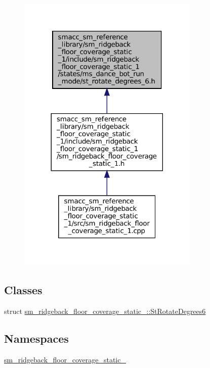 \begin{figure}[H]
\begin{center}
\leavevmode
\includegraphics[width=245pt]{sm__ridgeback__floor__coverage__static__1_2include_2sm__ridgeback__floor__coverage__static__1_2s2f93729466c6f798fa1a91e0a43db285}
\end{center}
\end{figure}
\subsection*{Classes}
\begin{DoxyCompactItemize}
\item 
struct \hyperlink{structsm__ridgeback__floor__coverage__static__1_1_1StRotateDegrees6}{sm\+\_\+ridgeback\+\_\+floor\+\_\+coverage\+\_\+static\+\_\+::\+St\+Rotate\+Degrees6}
\end{DoxyCompactItemize}
\subsection*{Namespaces}
\begin{DoxyCompactItemize}
\item 
 \hyperlink{namespacesm__ridgeback__floor__coverage__static__1}{sm\+\_\+ridgeback\+\_\+floor\+\_\+coverage\+\_\+static\+\_}
\end{DoxyCompactItemize}
